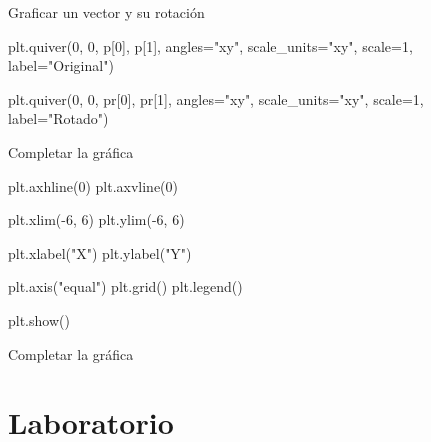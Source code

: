 \documentclass[aspectratio=169]{beamer}
\begin{document}
\begin{frame}[fragile]{Graficar un vector y su rotación}

    \begin{pythoncodedark}
        plt.quiver(0, 0, p[0], p[1],
        angles="xy", scale_units="xy",
        scale=1, label="Original")

        plt.quiver(0, 0, pr[0], pr[1],
        angles="xy", scale_units="xy",
        scale=1, label="Rotado")
    \end{pythoncodedark}

\end{frame}

\begin{frame}[fragile]{Completar la gráfica}

    \begin{pythoncodedark}
        plt.axhline(0)
        plt.axvline(0)

        plt.xlim(-6, 6)
        plt.ylim(-6, 6)

        plt.xlabel("X")
        plt.ylabel("Y")

        plt.axis("equal")
        plt.grid()
        plt.legend()

        plt.show()
    \end{pythoncodedark}

\end{frame}

\begin{frame}{Completar la gráfica}


    \vspace{0.3cm}


\end{frame}

\section{Laboratorio}
\end{document}
